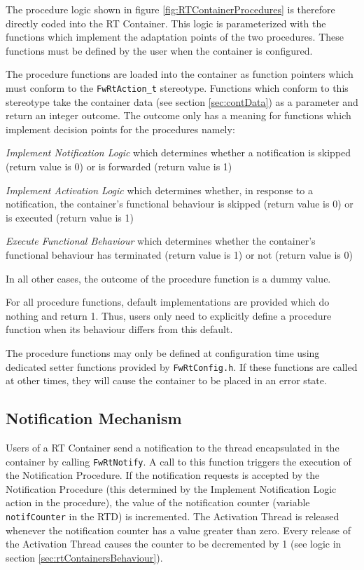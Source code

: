 \documentclass[manual]{../fwprofile}
\begin{document}
The procedure logic shown in figure \ref{fig:RTContainerProcedures} is therefore directly coded into the RT Container. This logic is parameterized with the functions which implement the adaptation points of the two procedures. These functions must be defined by the user when the container is configured.

The procedure functions are loaded into the container as function pointers which must conform to the \texttt{FwRtAction\_t} stereotype. Functions which conform to this stereotype take the container data (see section \ref{sec:contData}) as a parameter and return an integer outcome. The outcome only has a meaning for functions which implement decision points for the procedures namely:

\begin{fw_itemize}
\item \textit{Implement Notification Logic} which determines whether a notification is skipped (return value is 0) or is forwarded (return value is 1)
\item \textit{Implement Activation Logic} which determines whether, in response to a notification, the container's functional behaviour is skipped (return value is 0) or is executed (return value is 1)
\item \textit{Execute Functional Behaviour} which determines whether the container's functional behaviour has terminated (return value is 1) or not (return value is 0)
\end{fw_itemize}

In all other cases, the outcome of the procedure function is a dummy value.

For all procedure functions, default implementations are provided which do nothing and return 1. Thus, users only need to explicitly define a procedure function when its behaviour differs from this default.

The procedure functions may only be defined at configuration time using dedicated setter functions provided by \texttt{FwRtConfig.h}. If these functions are called at other times, they will cause the container to be placed in an error state.

\subsection{Notification Mechanism}\label{sec:notifMechanism}
Users of a RT Container send a notification to the thread encapsulated in the container by calling \texttt{FwRtNotify}. A call to this function triggers the execution of the Notification Procedure. If the notification requests is accepted by the Notification Procedure (this determined by the Implement Notification Logic action in the procedure), the value of the notification counter (variable \texttt{notifCounter} in the RTD) is incremented. The Activation Thread is released whenever the notification counter has a value greater than zero. Every release of the Activation Thread causes the counter to be decremented by 1 (see logic in section \ref{sec:rtContainersBehaviour}). 
\end{document}
